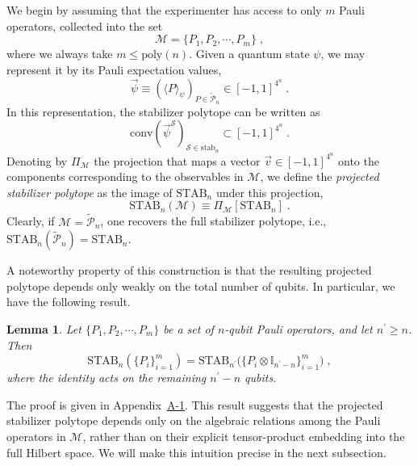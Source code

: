 \documentclass[10pt,aps,pra,twocolumn,floatfix,nofootinbib,superscriptaddress,longbibliography]{revtex4-2}
\newcommand{\1}{\mathbbm{1}}
\newtheorem{lem}[thm]{Lemma}
\begin{document}
We begin by assuming that the experimenter has access to only $m$ Pauli operators, collected into the set
\begin{equation}
    \mathcal M = \{P_1, P_2, \cdots, P_m\}\;,
\end{equation}
where we always take $m \leq \mathrm{poly}(n)$. Given a quantum state $\psi$, we may represent it by its Pauli expectation values,
\begin{equation}
    \vec{\psi}\equiv (\langle P \rangle_\psi )_{P \in \tilde{\mathcal P}_n} \in [-1,1]^{4^n}\;.
\end{equation}
In this representation, the stabilizer polytope can be written as
\[
\mathrm{conv}\!\left(\vec{\psi}^{\mathcal S}\right)_{\mathcal S \in \mathrm{stab}_n} \subset [-1,1]^{4^n}\;.
\]
Denoting by $\Pi_\mathcal M$ the projection that maps a vector $\vec v \in [-1,1]^{4^n}$ onto the components corresponding to the observables in $\mathcal M$, we define the \emph{projected stabilizer polytope} as the image of $\mathrm{STAB}_n$ under this projection,
\begin{equation}
    \mathrm{STAB}_n(\mathcal M)\equiv \Pi_\mathcal M[\mathrm{STAB}_n]\;.
\end{equation}
Clearly, if $\mathcal M = \tilde{\mathcal P}_n$, one recovers the full stabilizer polytope, i.e., $\mathrm{STAB}_n(\tilde{\mathcal P}_n)=\mathrm{STAB}_n$.

A noteworthy property of this construction is that the resulting projected polytope depends only weakly on the total number of qubits. In particular, we have the following result.
\begin{lem}
    Let $\{P_1, P_2, \cdots, P_m\}$ be a set of $n$-qubit Pauli operators, and let $n^\prime \geq n$. Then
    \begin{equation}
        \mathrm{STAB}_n(\{P_i\}_{i=1}^{m}) = \mathrm{STAB}_{n^\prime}\big(\{P_i \otimes \mathbb I_{n^\prime-n}\}_{i=1}^{m}\big)\;,
    \end{equation}
    where the identity acts on the remaining $n^\prime-n$ qubits.
    \label{lem:weakdepstab}
\end{lem}
The proof is given in Appendix~\hyperref[proof:weakdepstab]{A-1}. This result suggests that the projected stabilizer polytope depends only on the algebraic relations among the Pauli operators in $\mathcal M$, rather than on their explicit tensor-product embedding into the full Hilbert space. We will make this intuition precise in the next subsection.
\end{document}
